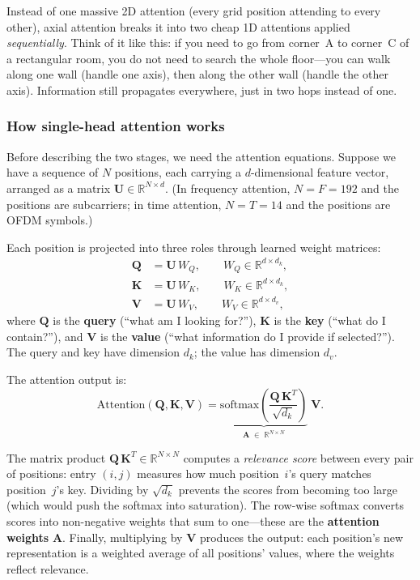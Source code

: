 \documentclass[11pt,a4paper]{article}
\begin{document}
	Instead of one massive 2D attention (every grid position attending to every other), axial attention breaks it into two cheap 1D attentions applied \emph{sequentially}.  Think of it like this: if you need to go from corner~A to corner~C of a rectangular room, you do not need to search the whole floor---you can walk along one wall (handle one axis), then along the other wall (handle the other axis).  Information still propagates everywhere, just in two hops instead of one.
	
	\subsubsection*{How single-head attention works}
	
	Before describing the two stages, we need the attention equations.  Suppose we have a sequence of $N$ positions, each carrying a $d$-dimensional feature vector, arranged as a matrix $\mathbf{U} \in \mathbb{R}^{N \times d}$.  (In frequency attention, $N\!=\!F\!=\!192$ and the positions are subcarriers; in time attention, $N\!=\!T\!=\!14$ and the positions are OFDM symbols.)
	
	Each position is projected into three roles through learned weight matrices:
	\begin{align}
		\mathbf{Q} &= \mathbf{U}\,W_Q, \qquad W_Q \in \mathbb{R}^{d \times d_k}, \label{eq:attn_q}\\
		\mathbf{K} &= \mathbf{U}\,W_K, \qquad W_K \in \mathbb{R}^{d \times d_k}, \label{eq:attn_k}\\
		\mathbf{V} &= \mathbf{U}\,W_V, \qquad W_V \in \mathbb{R}^{d \times d_v}, \label{eq:attn_v}
	\end{align}
	where $\mathbf{Q}$ is the \textbf{query} (``what am I looking for?''), $\mathbf{K}$ is the \textbf{key} (``what do I contain?''), and $\mathbf{V}$ is the \textbf{value} (``what information do I provide if selected?'').  The query and key have dimension $d_k$; the value has dimension $d_v$.
	
	The attention output is:
	\begin{equation}
		\mathrm{Attention}(\mathbf{Q}, \mathbf{K}, \mathbf{V}) = \underbrace{\mathrm{softmax}\!\left(\frac{\mathbf{Q}\,\mathbf{K}^T}{\sqrt{d_k}}\right)}_{\displaystyle\mathbf{A}\;\in\;\mathbb{R}^{N \times N}} \;\mathbf{V}.
		\label{eq:attn_sdp}
	\end{equation}
	
	The matrix product $\mathbf{Q}\,\mathbf{K}^T \in \mathbb{R}^{N \times N}$ computes a \emph{relevance score} between every pair of positions: entry $(i,j)$ measures how much position~$i$'s query matches position~$j$'s key.  Dividing by $\sqrt{d_k}$ prevents the scores from becoming too large (which would push the softmax into saturation).  The row-wise softmax converts scores into non-negative weights that sum to one---these are the \textbf{attention weights} $\mathbf{A}$.  Finally, multiplying by $\mathbf{V}$ produces the output: each position's new representation is a weighted average of all positions' values, where the weights reflect relevance.
	
\end{document}
